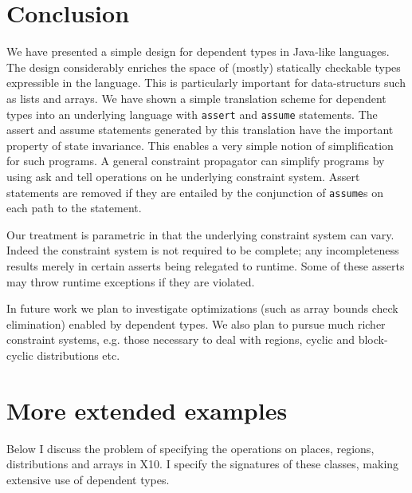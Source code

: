 \documentclass{article}
\def\Xten{{\sf X10}}
\def\java{{\sf Java}}
\begin{document}
\section{Conclusion}
We have presented a simple design for dependent types in \java-like
languages. The design considerably enriches the space of (mostly)
statically checkable types expressible in the language. This is
particularly important for data-structurs such as lists and arrays. We
have shown a simple translation scheme for dependent types into an
underlying language with {\tt assert} and {\tt assume} statements.
The assert and assume statements generated by this translation have
the important property of state invariance. This enables a very simple
notion of simplification for such programs. A general constraint
propagator can simplify programs by using ask and tell operations on
he underlying constraint system. Assert statements are removed if they
are entailed by the conjunction of {\tt assume}s on each path to the
statement.

Our treatment is parametric in that the underlying constraint system
can vary. Indeed the constraint system is not required to be complete;
any incompleteness results merely in certain asserts being relegated
to runtime. Some of these asserts may throw runtime exceptions if they
are violated.

In future work we plan to investigate optimizations (such as array
bounds check elimination) enabled by dependent types. We also plan to
pursue much richer constraint systems, e.g.{} those necessary to deal
with regions, cyclic and block-cyclic distributions etc. 



\appendix
\section{More extended examples}
Below I discuss the problem of specifying the operations on places, regions,
distributions and arrays in \Xten. I specify the signatures of these
classes, making extensive use of dependent types.
\end{document}

